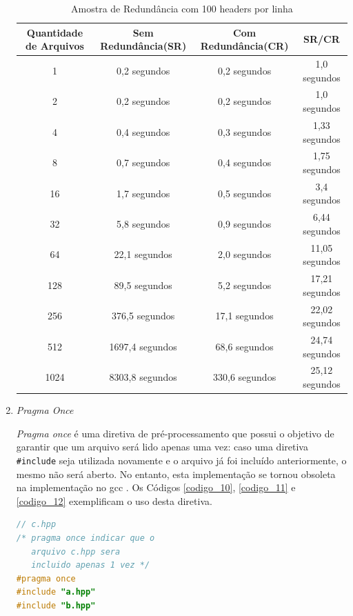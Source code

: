 \begin{enumerate}
\begin{table}[!ht]
    \centering
    \caption {Amostra de Redundância com 100 headers por linha }
    \label{tab:tabela_02}
    \begin{tiny}
    \begin{tabular}{cccc}
    \toprule
    \textbf{Quantidade de Arquivos} & \textbf{Sem Redundância(SR)} & \textbf{Com Redundância(CR)} &  \textbf{SR/CR} \\
    \midrule
    1 			& 0,2 	 segundos		& 0,2  segundos		& 1,0		segundos \\
    2 			& 0,2 	 segundos		& 0,2  segundos		& 1,0		segundos \\
    4 			& 0,4 	 segundos		& 0,3  segundos		& 1,33		segundos \\
    8 			& 0,7 	 segundos		& 0,4  segundos		& 1,75		segundos \\
    16 			& 1,7 	 segundos		& 0,5  segundos		& 3,4		segundos \\
    32 			& 5,8 	 segundos		& 0,9  segundos		& 6,44		segundos \\
    64 			& 22,1 	 segundos		& 2,0  segundos		& 11,05		segundos \\
    128 		& 89,5 	 segundos		& 5,2  segundos		& 17,21		segundos \\
    256 		& 376,5  segundos		& 17,1 segundos 	& 22,02		segundos \\
    512 		& 1697,4 segundos 		& 68,6 segundos 	& 24,74		segundos \\
    1024 		& 8303,8 segundos 		& 330,6  segundos 	& 25,12		segundos \\
    \bottomrule
    \end{tabular}
    \end{tiny}
\end{table}

\item \textit{Pragma Once}

\textit{Pragma once} é uma diretiva de pré-processamento que possui o objetivo de
 garantir que um arquivo será lido apenas uma vez: caso uma diretiva 
\texttt{\#include} seja utilizada novamente e o arquivo já foi incluído anteriormente,
 o mesmo não será aberto. No entanto, esta implementação se tornou obsoleta 
 na implementação no gcc \cite{gccpragmaonce}. Os Códigos \ref{codigo_10}, \ref{codigo_11} e \ref{codigo_12} exemplificam o uso desta diretiva.



\begin{lstlisting}[language=C++,caption={
                Arquivo c.hpp com guarda de inclusão \texttt{\#pragma once}},
                                                            label=codigo_10]
// c.hpp
/* pragma once indicar que o 
   arquivo c.hpp sera
   incluido apenas 1 vez */
#pragma once            
#include "a.hpp"
#include "b.hpp"


\end{lstlisting}
\end{enumerate}

